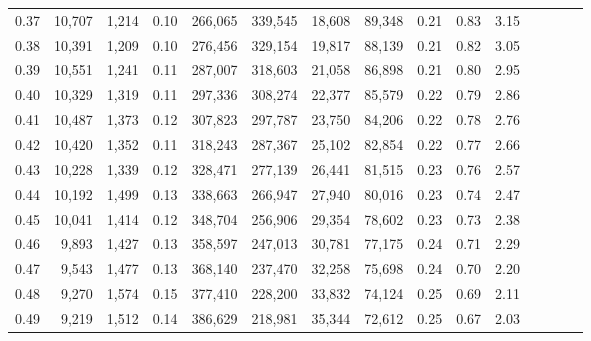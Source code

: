 \begin{tabular}{rrrcrrrrrrrrrrr}
0.37 &  10,707 &  1,214 &                                       0.10 &  266,065 &  339,545 &   18,608 &   89,348 &  0.21 &  0.83 &                         3.15 \\
0.38 &  10,391 &  1,209 &                                       0.10 &  276,456 &  329,154 &   19,817 &   88,139 &  0.21 &  0.82 &                         3.05 \\
0.39 &  10,551 &  1,241 &                                       0.11 &  287,007 &  318,603 &   21,058 &   86,898 &  0.21 &  0.80 &                         2.95 \\
0.40 &  10,329 &  1,319 &                                       0.11 &  297,336 &  308,274 &   22,377 &   85,579 &  0.22 &  0.79 &                         2.86 \\
0.41 &  10,487 &  1,373 &                                       0.12 &  307,823 &  297,787 &   23,750 &   84,206 &  0.22 &  0.78 &                         2.76 \\
0.42 &  10,420 &  1,352 &                                       0.11 &  318,243 &  287,367 &   25,102 &   82,854 &  0.22 &  0.77 &                         2.66 \\
0.43 &  10,228 &  1,339 &                                       0.12 &  328,471 &  277,139 &   26,441 &   81,515 &  0.23 &  0.76 &                         2.57 \\
0.44 &  10,192 &  1,499 &                                       0.13 &  338,663 &  266,947 &   27,940 &   80,016 &  0.23 &  0.74 &                         2.47 \\
0.45 &  10,041 &  1,414 &                                       0.12 &  348,704 &  256,906 &   29,354 &   78,602 &  0.23 &  0.73 &                         2.38 \\
0.46 &   9,893 &  1,427 &                                       0.13 &  358,597 &  247,013 &   30,781 &   77,175 &  0.24 &  0.71 &                         2.29 \\
0.47 &   9,543 &  1,477 &                                       0.13 &  368,140 &  237,470 &   32,258 &   75,698 &  0.24 &  0.70 &                         2.20 \\
0.48 &   9,270 &  1,574 &                                       0.15 &  377,410 &  228,200 &   33,832 &   74,124 &  0.25 &  0.69 &                         2.11 \\
0.49 &   9,219 &  1,512 &                                       0.14 &  386,629 &  218,981 &   35,344 &   72,612 &  0.25 &  0.67 &                         2.03 \\

\end{tabular}
